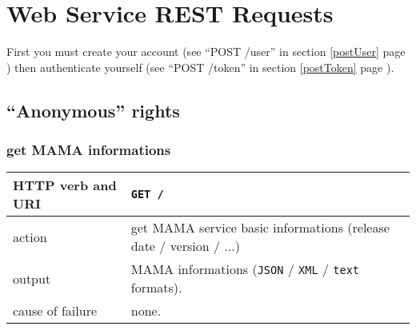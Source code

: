 


%

\section{Web Service REST Requests}
\hspace*{\parindent}

First you must create your account (see ``POST /user'' in section \ref{postUser} page \pageref{postUser}) then authenticate yourself (see ``POST /token'' in section \ref{postToken} page \pageref{postToken}).

\subsection{``Anonymous'' rights}

\subsubsection{get MAMA informations}
\begin{tabular}{ | l | l | }
	\hline
	HTTP verb and URI & \texttt{GET /} \\
	\hline
	action & get MAMA service basic informations (release date / version / ...) \\
	\hline
	output & MAMA informations (\texttt{JSON} / \texttt{XML} / \texttt{text} formats). \\
	\hline
	cause of failure & none. \\
	\hline
\end{tabular}
\newline

